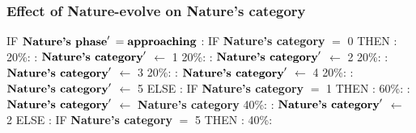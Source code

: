 \documentclass{article}%
\begin{document}
%
\subsubsection{Effect of Nature{-}evolve on Nature's category}%
\label{ssubsec:Effect of Nature{-}evolve on Nature's category}%
\begin{flushleft}%
IF %
$\mbox{\textbf{Nature's phase}} '$%
\linebreak%
\hspace*{2em}%
$= \mbox{\textbf{approaching}}$%
: %
IF %
\textbf{Nature's category}%
$=$%
0%
\linebreak%
\hspace*{4em}%
THEN %
: %
\linebreak%
\hspace*{6em}%
20\%:%
: %
$\mbox{\textbf{Nature's category}} '$%
$\leftarrow$%
1%
\linebreak%
\hspace*{6em}%
20\%:%
: %
$\mbox{\textbf{Nature's category}} '$%
$\leftarrow$%
2%
\linebreak%
\hspace*{6em}%
20\%:%
: %
$\mbox{\textbf{Nature's category}} '$%
$\leftarrow$%
3%
\linebreak%
\hspace*{6em}%
20\%:%
: %
$\mbox{\textbf{Nature's category}} '$%
$\leftarrow$%
4%
\linebreak%
\hspace*{6em}%
20\%:%
: %
$\mbox{\textbf{Nature's category}} '$%
$\leftarrow$%
5%
\linebreak%
\hspace*{4em}%
ELSE %
: %
IF %
\textbf{Nature's category}%
$=$%
1%
\linebreak%
\hspace*{6em}%
THEN %
: %
\linebreak%
\hspace*{8em}%
60\%:%
: %
$\mbox{\textbf{Nature's category}} '$%
$\leftarrow$%
\textbf{Nature's category}%
\linebreak%
\hspace*{8em}%
40\%:%
: %
$\mbox{\textbf{Nature's category}} '$%
$\leftarrow$%
2%
\linebreak%
\hspace*{6em}%
ELSE %
: %
IF %
\textbf{Nature's category}%
$=$%
5%
\linebreak%
\hspace*{8em}%
THEN %
: %
\linebreak%
\hspace*{10em}%
40\%:%

\end{flushleft}
\end{document}
